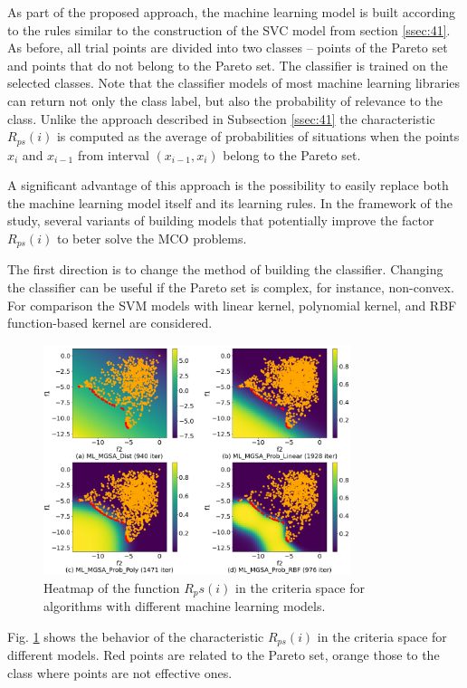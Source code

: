 \documentclass[runningheads]{llncs}
\begin{document}
As part of the proposed approach, the machine learning model is built according to the rules similar to the construction of the SVC model from section \ref{ssec:41}. As before, all trial points are divided into two classes -- points of the Pareto set and points that do not belong to the Pareto set. The classifier is trained on the selected classes. Note that the classifier models of most machine learning libraries can return not only the class label, but also the probability of relevance to the class. Unlike the approach described in Subsection \ref{ssec:41} the characteristic $R_{ps}(i)$ is computed as the average of probabilities of situations when the points $x_i$ and $x_{i-1}$ from interval $(x_{i-1},x_{i})$ belong to the Pareto set.

A significant advantage of this approach is the possibility to easily replace both the machine learning model itself and its learning rules. In the framework of the study, several variants of building models that potentially improve the factor $R_{ps}(i)$ to beter solve the MCO problems.

The first direction is to change the method of building the classifier. Changing the classifier can be useful if the Pareto set is complex, for instance, non-convex.
For comparison the SVM models with linear kernel, polynomial kernel, and RBF function-based kernel are considered.

\begin{figure}
\centering
\includegraphics[width=0.8\textwidth]{fig1.png}
\caption{Heatmap of the function $R_ps(i)$ in the criteria space for algorithms with different machine learning models.} 
\label{fig:1}
\end{figure}

Fig. \ref{fig:1} shows the behavior of the characteristic $R_{ps}(i)$ in the criteria space for different models. Red points are related to the Pareto set, orange those to the class  where points are not effective ones. 
\end{document}
